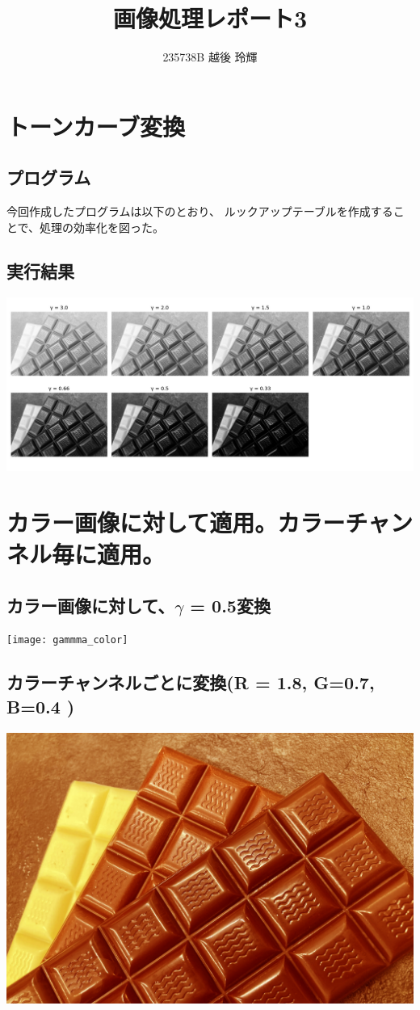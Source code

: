 \documentclass[a4paper,11pt,titlepage]{jsarticle}
\title{画像処理レポート3}
\author{235738B 越後 玲輝}
\begin{document}
\maketitle
\newpage

\section{トーンカーブ変換}
\subsection{プログラム}
今回作成したプログラムは以下のとおり、
ルックアップテーブルを作成することで、処理の効率化を図った。


\subsection{実行結果}
\begin{center}
  \includegraphics[width=0.8\linewidth]{gamma_gray_all.jpg} 
\end{center}

\section{カラー画像に対して適用。カラーチャンネル毎に適用。}
\subsection{カラー画像に対して、$\gamma$ = 0.5変換}
\begin{center}
  \texttt{[image: gammma\_color]} 
\end{center}

\subsection{カラーチャンネルごとに変換(R = 1.8, G=0.7, B=0.4 )}
\begin{center}
  \includegraphics[width=0.8\linewidth]{gamma_color_fantasy.jpg} 
\end{center}
\end{document}
